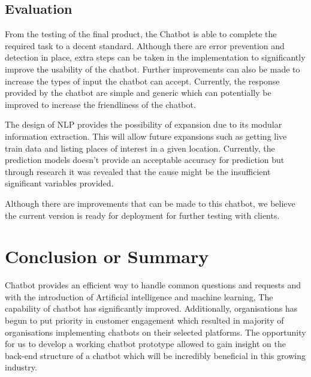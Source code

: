 \documentclass[11pt]{article}
\begin{document}
\subsection{Evaluation}
From the testing of the final product, the Chatbot is able to complete the required task to a decent standard. Although there are error prevention and detection in place, extra steps can be taken in the implementation to significantly improve the usability of the chatbot. Further improvements can also be made to increase the types of input the chatbot can accept. Currently, the response provided by the chatbot are simple and generic which can potentially be improved to increase the friendliness of the chatbot.

The design of NLP provides the possibility of expansion due to its modular information extraction. This will allow future expansions such as getting live train data and listing places of interest in a given location. Currently, the prediction models doesn't provide an acceptable accuracy for prediction but through research it was revealed that the cause might be the insufficient significant variables provided. 

Although there are improvements that can be made to this chatbot, we believe the current version is ready for deployment for further testing with clients.

\section{Conclusion or Summary}
Chatbot provides an efficient way to handle common questions and requests and with the introduction of Artificial intelligence and machine learning, The capability of chatbot has significantly improved. Additionally, organisations has begun to put priority in customer engagement which resulted in majority of organisations implementing chatbots on their selected platforms. The opportunity for us to develop a working chatbot prototype allowed to gain insight on the back-end structure of a chatbot which will be incredibly beneficial in this growing industry.


%
 
\end{document}
